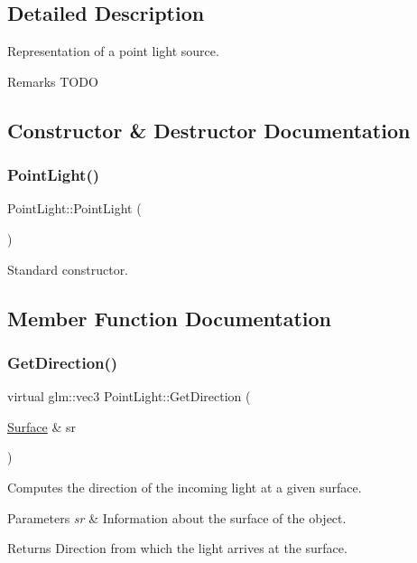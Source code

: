 \subsection{Detailed Description}
Representation of a point light source. \begin{DoxyRemark}{Remarks}
T\+O\+DO 
\end{DoxyRemark}


\subsection{Constructor \& Destructor Documentation}
\hypertarget{class_point_light_abbfdf5f05b559c49016f8bb97b0ca414}{}\label{class_point_light_abbfdf5f05b559c49016f8bb97b0ca414} 
\subsubsection{\texorpdfstring{Point\+Light()}{PointLight()}}
{\footnotesize\ttfamily Point\+Light\+::\+Point\+Light (\begin{DoxyParamCaption}{ }\end{DoxyParamCaption})}

Standard constructor. 

\subsection{Member Function Documentation}
\hypertarget{class_point_light_af587fd5a2e72f32fcf5041a2cfb055e1}{}\label{class_point_light_af587fd5a2e72f32fcf5041a2cfb055e1} 
\subsubsection{\texorpdfstring{Get\+Direction()}{GetDirection()}}
{\footnotesize\ttfamily virtual glm\+::vec3 Point\+Light\+::\+Get\+Direction (\begin{DoxyParamCaption}\item[{\hyperlink{class_surface}{Surface} \&}]{sr }\end{DoxyParamCaption})\hspace{0.3cm}{\ttfamily [virtual]}}

Computes the direction of the incoming light at a given surface. 
\begin{DoxyParams}{Parameters}
{\em sr} & Information about the surface of the object. \\
\hline
\end{DoxyParams}
\begin{DoxyReturn}{Returns}
Direction from which the light arrives at the surface. 
\end{DoxyReturn}


